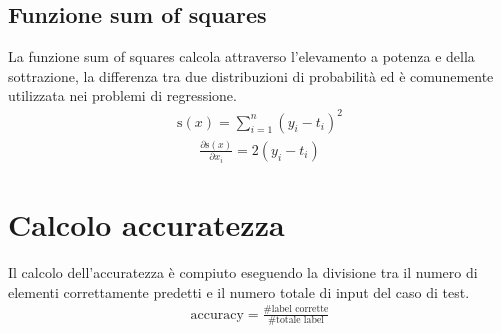 \subsection{Funzione sum of squares}
La funzione sum of squares calcola attraverso l'elevamento a potenza e della sottrazione, la differenza tra due distribuzioni di probabilità ed è comunemente utilizzata nei problemi di regressione.
\begin{align*}
\text{s}(x) = \sum_{i=1}^{n} (y_i - t_i)^2
\end{align*}
\begin{align*}
\frac{\partial \text{s}(x)}{\partial x_i} = 2 (y_i - t_i)
\end{align*}

\section{Calcolo accuratezza}
Il calcolo dell'accuratezza è compiuto eseguendo la divisione tra il numero di elementi correttamente predetti e il numero totale di input del caso di test.
\begin{align*}
\text{accuracy} = \frac{\text{\# label corrette}}{\text{\# totale label}}
\end{align*}

